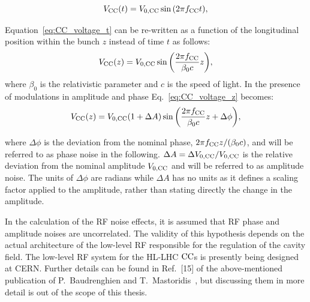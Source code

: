 \begin{equation}\label{eq:CC_voltage_t}
    V_\mathrm{CC}(t) = {V_\mathrm{0, CC}} \sin{\left ( 2 \pi {f_\mathrm{CC}}t \right )},
\end{equation}

Equation~\eqref{eq:CC_voltage_t} can be re-written as a function of the longitudinal position within the bunch $z$ instead of time $t$ as follows:
\begin{equation}\label{eq:CC_voltage_z}
    V_\mathrm{CC}(z) = {V_\mathrm{0, CC}} \sin{\left ( \frac{2\pi {f_\mathrm{CC}}}{\beta_0 c}z \right )},
\end{equation}
where $\beta_0$ is the relativistic parameter and $c$ is the speed of light. %
In the presence of modulations in amplitude and phase Eq.~\eqref{eq:CC_voltage_z} becomes:%
\begin{equation}\label{eq:CC_voltage_z_noise}
    V_\mathrm{CC}(z) = {V_\mathrm{0, CC}} (1+\Delta A) \sin{\left ( \frac{2\pi {f_\mathrm{CC}}}{\beta_0 c}z + \Delta \phi \right )},
\end{equation}

where $\Delta \phi$ is the deviation from the nominal phase, $2\pi {f_\mathrm{CC}} z/(\beta_0 c)$, and will be referred to as phase noise in the following. $\Delta A = \Delta {V_\mathrm{0, CC}} / {V_\mathrm{0, CC}}$ is the relative deviation from the nominal amplitude ${V_\mathrm{0, CC}}$ and will be referred to as amplitude noise. The units of $\Delta \phi$ are radians while $\Delta A$ has no units as it defines a scaling factor applied to the amplitude, rather than stating directly the change in the amplitude.

In the calculation of the RF noise effects, it is assumed that RF phase and amplitude noises are uncorrelated. The validity of this hypothesis depends on the actual architecture of the low-level RF responsible for the regulation of the cavity field. The low-level RF system for the HL-LHC ${\mathrm{CC}}$s is presently being designed at CERN. Further details can be found in Ref.~[15] of the above-mentioned publication of P.~Baudrenghien and T.~Mastoridis~\cite{PhysRevSTAB.18.101001}, but discussing them in more detail is out of the scope of this thesis.
 

